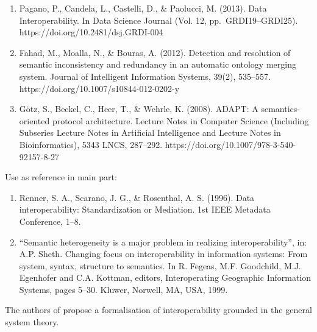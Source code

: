 \documentclass[sort&compress,preprint,authoryear,3p,twocolumn]{elsarticle}
\providecommand{\tightlist}{%
  \setlength{\itemsep}{0pt}\setlength{\parskip}{0pt}}
\begin{document}
\begin{enumerate}
\def\labelenumi{\arabic{enumi}.}
\tightlist
\item
  Pagano, P., Candela, L., Castelli, D., \& Paolucci, M. (2013). Data
  Interoperability. In Data Science Journal (Vol. 12,
  pp.~GRDI19--GRDI25). https://doi.org/10.2481/dsj.GRDI-004
\item
  Fahad, M., Moalla, N., \& Bouras, A. (2012). Detection and resolution
  of semantic inconsistency and redundancy in an automatic ontology
  merging system. Journal of Intelligent Information Systems, 39(2),
  535--557. https://doi.org/10.1007/s10844-012-0202-y
\item
  Götz, S., Beckel, C., Heer, T., \& Wehrle, K. (2008). ADAPT: A
  semantics-oriented protocol architecture. Lecture Notes in Computer
  Science (Including Subseries Lecture Notes in Artificial Intelligence
  and Lecture Notes in Bioinformatics), 5343 LNCS, 287--292.
  https://doi.org/10.1007/978-3-540-92157-8-27
\end{enumerate}

Use as reference in main part:

\begin{enumerate}
\def\labelenumi{\arabic{enumi}.}
\tightlist
\item
  Renner, S. A., Scarano, J. G., \& Rosenthal, A. S. (1996). Data
  interoperability: Standardization or Mediation. 1st IEEE Metadata
  Conference, 1--8.
\item
  ``Semantic heterogeneity is a major problem in realizing
  interoperability'', in: A.P. Sheth. Changing focus on interoperability
  in information systems: From system, syntax, structure to semantics.
  In R. Fegeas, M.F. Goodchild, M.J. Egenhofer and C.A. Kottman,
  editors, Interoperating Geographic Information Systems, pages 5--30.
  Kluwer, Norwell, MA, USA, 1999.
\end{enumerate}

The authors of \cite{Naudet2010} propose a formalisation of
interoperability grounded in the general system theory.
\end{document}
